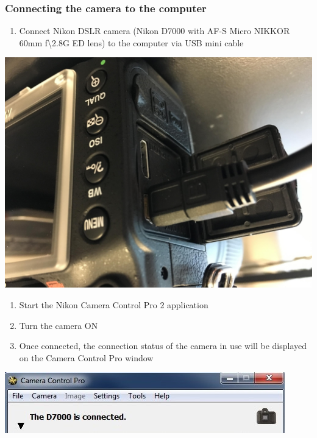 \documentclass[]{book}
\providecommand{\tightlist}{%
  \setlength{\itemsep}{0pt}\setlength{\parskip}{0pt}}
\begin{document}
\hypertarget{connecting-the-camera-to-the-computer}{%
\subsubsection{Connecting the camera to the computer}\label{connecting-the-camera-to-the-computer}}

\begin{enumerate}
\def\labelenumi{\arabic{enumi}.}
\tightlist
\item
  Connect Nikon DSLR camera (Nikon D7000 with AF-S Micro NIKKOR 60mm f\textbackslash2.8G ED lens) to the computer via USB mini cable
\end{enumerate}

\includegraphics{images/Camera.jpg}

\begin{enumerate}
\def\labelenumi{\arabic{enumi}.}
\setcounter{enumi}{1}
\item
  Start the Nikon Camera Control Pro 2 application
\item
  Turn the camera ON
\item
  Once connected, the connection status of the camera in use will be displayed on the Camera Control Pro window
\end{enumerate}

\includegraphics{images/Camera2.jpg}
\end{document}
